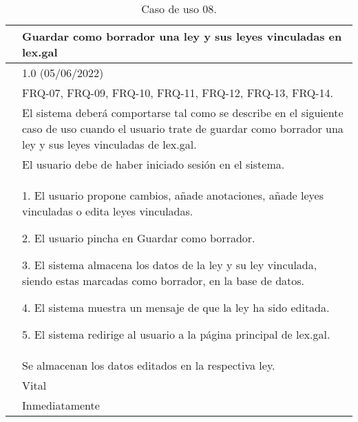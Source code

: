 \begin{table}[H]
\begin{center}
\begin{tabular}{|p{3cm}|p{10cm}|} \hline
\centering {\bf UC-08} & Guardar como borrador una ley y sus leyes vinculadas en lex.gal  \\ \hline\hline
\centering {\bf Versión} & 1.0 (05/06/2022) \\ \hline
\centering {\bf Dependencias} & FRQ-07, FRQ-09, FRQ-10, FRQ-11, FRQ-12, FRQ-13, FRQ-14. \\ \hline
\centering {\bf Descripción} &  El sistema deberá comportarse tal como se describe en el siguiente caso de uso cuando el usuario trate de guardar como borrador una ley y sus leyes vinculadas de lex.gal. \\ \hline
\centering {\bf Precondición} &  El usuario debe de haber iniciado sesión en el sistema. \\ \hline
\centering {\bf Secuencia normal} &  
1. El usuario propone cambios, añade anotaciones, añade leyes vinculadas o edita leyes vinculadas.

2. El usuario pincha en Guardar como borrador.

3. El sistema almacena los datos de la ley y su ley vinculada, siendo estas marcadas como borrador, en la base de datos.

4. El sistema muestra un mensaje de que la ley ha sido editada.

5. El sistema redirige al usuario a la página principal de lex.gal.
\\ \hline
\centering {\bf Postcondición} &  Se almacenan los datos editados en la respectiva ley. \\ \hline
\centering {\bf Importancia} & Vital \\ \hline
\centering {\bf Urgencia} & Inmediatamente \\ \hline
\end{tabular}
\caption{Caso de uso 08.}
\label{enlaceUC8}
\end{center}
\end{table}

